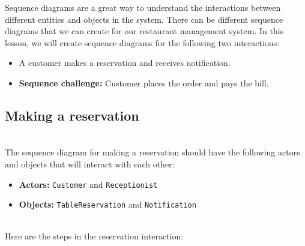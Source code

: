 

Sequence diagrams are a great way to understand the interactions between different entities and objects in the system. There can be different sequence diagrams that we can create for our restaurant management system. In this lesson, we will create sequence diagrams for the following two interactions:

\begin{itemize}
\item
\protect{}\label{3kq5RhAx4Rv9AbuQRnVPg}
A customer makes a reservation and receives notification.
\item
\protect{}\label{62zGajFIchyuWPnhnQshZ}
\textbf{Sequence challenge:} Customer places the order and pays the bill.
\end{itemize}

\subsection{Making a reservation}\label{BVgKhKGUMnicvRp0i6fle}
\\
The sequence diagram for making a reservation should have the following actors and objects that will interact with each other:

\begin{itemize}
\item
\protect{}\label{4GNpsOPyoded2pjeMoyAG}
\textbf{Actors:} \texttt{Customer} and \texttt{Receptionist}
\item
\protect{}\label{iXG0Qw4kSBPoTBEqGnHU_}
\textbf{Objects:} \texttt{TableReservation} and \texttt{Notification}
\end{itemize}
\\
Here are the steps in the reservation interaction:

